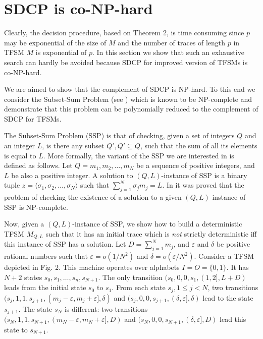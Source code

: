 \documentclass[conference]{IEEEtran}
\begin{document}
\section{SDCP is co-NP-hard}

Clearly, the decision procedure, based on Theorem 2, is time consuming since $p$ may be exponential of the size of $M$ and the number of traces of length $p$ in TFSM $M$ is exponential of $p$. In this section we show that such an exhaustive search can hardly be avoided because SDCP for improved version of TFSMs is co-NP-hard. 

We are aimed to show that the complement of SDCP is NP-hard. To this end we consider the Subset-Sum Problem (see \cite{ssp}) which is known to be NP-complete and demonstrate that this problem can be polynomially reduced to the complement of SDCP for TFSMs. 

The Subset-Sum Problem (SSP) is that of checking, given a set of integers $Q$ and an integer $L$, is there any subset $Q', Q'\subseteq Q$, such that the sum of all its elements is equal to $L$. More formally, the variant of the SSP we are interested in is defined as follows. Let $Q=m_1,m_2,\dots, m_N$ be a sequence of positive integers, and $L$ be also a positive integer. A solution to $(Q,L)$-instance of SSP is a binary tuple $z=\langle \sigma_1,\sigma_2,\dots, \sigma_N\rangle$ such that $\sum\limits_{j=1}^N \sigma_j m_j=L$. In \cite{ssp} it was proved that the problem of checking the existence of a solution to a given $(Q,L)$-instance of SSP is NP-complete.

Now, given a $(Q,L)$-instance of SSP, we show how to build a deterministic TFSM $M_{Q,L}$ such that it has an initial trace which is \emph{not} strictly deterministic iff this instance of SSP has a solution. Let $D=\sum\limits_{j=1}^N m_j$, and $\varepsilon$ and $\delta$ be positive rational numbers such that $\varepsilon = o(1/N^2)$ and $\delta=o(\varepsilon/N^2)$. Consider a TFSM depicted in Fig. 2. This machine operates over alphabets $I=O=\{0,1\}$. It has $N+2$ states $s_0,s_1,\dots,s_n,s_{N+1}$. The only transition $(s_0,0,0,s_1,(1,2],L+D)$ leads from the initial state $s_0$ to $s_1$. From each state $s_j, 1\!\leq\! j\!<\! N$, two transitions $(s_j,1,1,s_{j+1},(m_j-\varepsilon,m_j+\varepsilon],\delta)$ and $(s_j,0,0,s_{j+1},(\delta,\varepsilon],\delta)$ lead to the state $s_{j+1}$. The state $s_N$ is different: two transitions $(s_N,1,1,s_{N+1},(m_N-\varepsilon,m_N+\varepsilon],D)$ and $(s_N,0,0,s_{N+1},(\delta,\varepsilon],D)$ lead this state to $s_{N+1}$.
\end{document}
